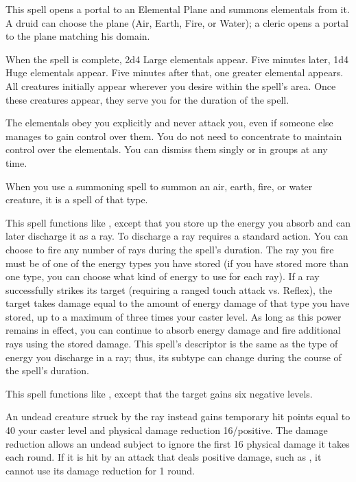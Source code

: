 \spelldur{\durlong \dismissable}
\spelleffect This spell opens a portal to an Elemental Plane and summons elementals from it. A druid can choose the plane (Air, Earth, Fire, or Water); a cleric opens a portal to the plane matching his domain.
\par When the spell is complete, 2d4 Large elementals appear. Five minutes later, 1d4 Huge elementals appear. Five minutes after that, one greater elemental appears. All creatures initially appear wherever you desire within the spell's area. Once these creatures appear, they serve you for the duration of the spell.
\par The elementals obey you explicitly and never attack you, even if someone else manages to gain control over them. You do not need to concentrate to maintain control over the elementals. You can dismiss them singly or in groups at any time.
\par When you use a summoning spell to summon an air, earth, fire, or water creature, it is a spell of that type.

\spelleffect This spell functions like , except that you store up the energy you absorb and can later discharge it as a ray. To discharge a ray requires a standard action. You can choose to fire any number of rays during the spell's duration. The ray you fire must be of one of the energy types you have stored (if you have stored more than one type, you can choose what kind of energy to use for each ray). If a ray successfully strikes its target (requiring a ranged touch attack vs. Reflex), the target takes damage equal to the amount of energy damage of that type you have stored, up to a maximum of three times your caster level. As long as this power remains in effect, you can continue to absorb energy damage and fire additional rays using the stored damage.
\spellnotes This spell's descriptor is the same as the type of energy you discharge in a ray; thus, its subtype can change during the course of the spell's duration.

\spelleffect This spell functions like , except that the target gains six negative levels.
\par An undead creature struck by the ray instead gains temporary hit points equal to 40 \add your caster level and physical damage reduction 16/positive. 
\spellnotes The damage reduction allows an undead subject to ignore the first 16 physical damage it takes each round. If it is hit by an attack that deals positive damage, such as , it cannot use its damage reduction for 1 round.

